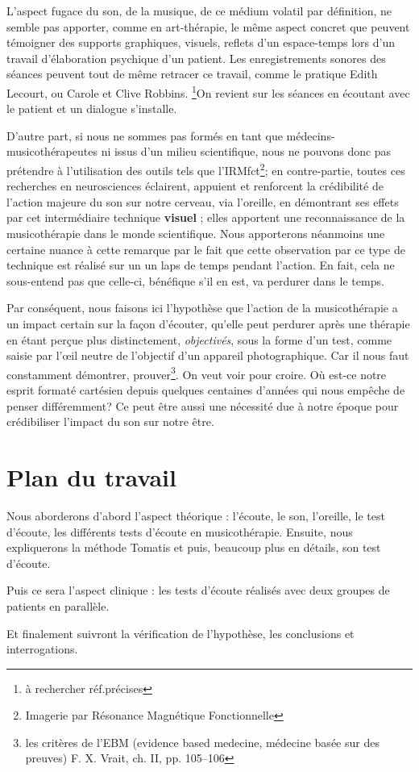  
  
L'aspect fugace du son, de la musique, de ce médium volatil par
définition, ne semble pas apporter, comme en art-thérapie, le
même aspect concret que peuvent témoigner des supports graphiques,
visuels, reflets d'un espace-temps lors d'un travail d'élaboration
psychique d'un patient. Les enregistrements sonores des séances peuvent tout de 
même retracer ce travail, comme le pratique Edith Lecourt, ou Carole et Clive 
Robbins. \footnote{à rechercher réf.précises}On revient sur les séances en écoutant avec le patient et un dialogue s'installe.


D'autre part, si nous ne sommes pas formés en tant que médecins-musicothérapeutes ni issus 
d'un milieu scientifique, nous ne pouvons donc  pas prétendre à l'utilisation 
des outils
 tels que l'IRMfct\footnote{Imagerie par Résonance Magnétique Fonctionnelle}; 
en contre-partie, toutes ces recherches en
neurosciences éclairent, appuient et renforcent la crédibilité de l'action
majeure du son sur notre cerveau, via l'oreille, en démontrant ses effets par cet intermédiaire technique \textbf{visuel} ; elles apportent une 
reconnaissance de la musicothérapie dans le monde scientifique. Nous apporterons néanmoins une certaine nuance à cette remarque par le fait que cette observation par ce type de technique est réalisé sur un un laps de temps pendant l'action. En fait, cela ne sous-entend pas que celle-ci, bénéfique s'il en est, va perdurer dans le temps. 

Par conséquent, nous  faisons ici l'hypothèse que l'action de la 
musicothérapie a un impact certain sur la façon d'écouter, qu'elle peut perdurer après une thérapie en étant 
perçue plus
distinctement, \textsl{objectivés}, sous la forme d'un test, comme saisie par 
l'\oe il neutre de l'objectif d'un appareil
photographique.
Car il nous faut constamment démontrer, prouver\footnote{
	les critères de l'EBM (evidence based medecine, médecine basée sur des 
preuves) F. X. Vrait, ch. II, pp. 105--106 }. On veut voir pour croire. Où est-ce 
notre esprit formaté cartésien depuis quelques centaines d'années qui nous 
empêche de penser différemment? 
Ce peut être aussi une nécessité due à notre époque pour crédibiliser l'impact 
du son sur notre être. 


\section{Plan du travail}

Nous aborderons d'abord l'aspect théorique : l'écoute, le son, l'oreille, le 
test d'écoute, les différents tests d'écoute en musicothérapie.  Ensuite, nous 
expliquerons  la méthode Tomatis
et puis, beaucoup plus en détails,  son test d'écoute.

Puis ce sera l'aspect clinique : les tests d'écoute réalisés  avec deux groupes 
de patients en parallèle.

Et finalement suivront la vérification de l'hypothèse, les conclusions et 
interrogations. 
